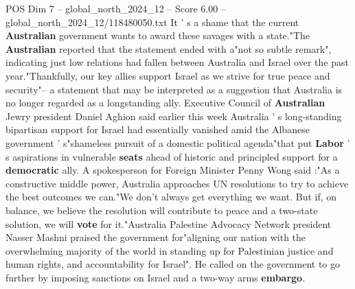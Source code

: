 \begin{textsample}{POS Dim 7 – global\_north\_2024\_12 – Score 6.00 – global\_north\_2024\_12/118480050.txt}
It ' s a shame that the current \textbf{Australian} government wants to award these savages with a state."The \textbf{Australian} reported that the statement ended with a"not so subtle remark", indicating just low relations had fallen between Australia and Israel over the past year."Thankfully, our key allies support Israel as we strive for true peace and security"-- a statement that may be interpreted as a suggestion that Australia is no longer regarded as a longstanding ally.
Executive Council of \textbf{Australian} Jewry president Daniel Aghion said earlier this week Australia ' s long-standing bipartisan support for Israel had essentially vanished amid the Albanese government ' s"shameless pursuit of a domestic political agenda"that put \textbf{Labor} ' s aspirations in vulnerable \textbf{seats} ahead of historic and principled support for a \textbf{democratic} ally.
A spokesperson for Foreign Minister Penny Wong said :"As a constructive middle power, Australia approaches UN resolutions to try to achieve the best outcomes we can."We don't always get everything we want.
But if, on balance, we believe the resolution will contribute to peace and a two-state solution, we will \textbf{vote} for it."Australia Palestine Advocacy Network president Nasser Mashni praised the government for"aligning our nation with the overwhelming majority of the world in standing up for Palestinian justice and human rights, and accountability for Israel".
He called on the government to go further by imposing sanctions on Israel and a two-way arms \textbf{embargo}.

\end{textsample}
